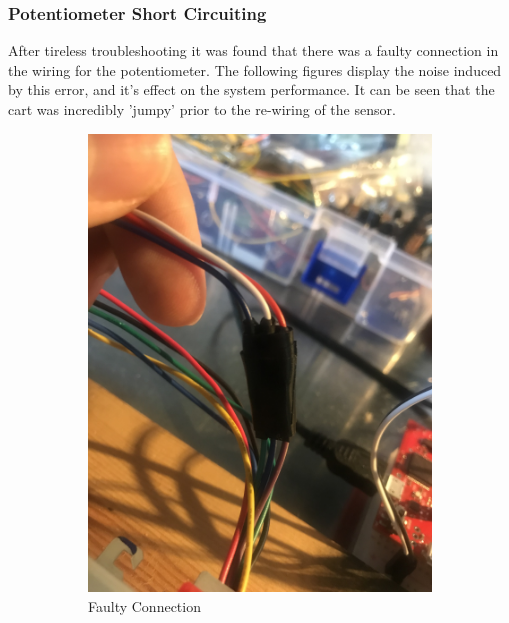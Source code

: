 \documentclass[12pt]{article}
\begin{document}
\subsubsection{Potentiometer Short Circuiting}
After tireless troubleshooting it was found that there was a faulty connection in the wiring for the potentiometer. The following figures display the noise induced by this error, and it's effect on the system performance. It can be seen that the cart was incredibly 'jumpy' prior to the re-wiring of the sensor.
\begin{figure}[H]
    \centering
    \begin{subfigure}{.49\textwidth}
      \centering
      \includegraphics[width=1\linewidth]{figures/IMG_5968.jpg}
      \caption{Faulty Connection}
      \label{fig:conn}
    \end{subfigure}
    \begin{subfigure}{.4\textwidth}
      \centering

\end{subfigure}
\end{figure}
\end{document}

